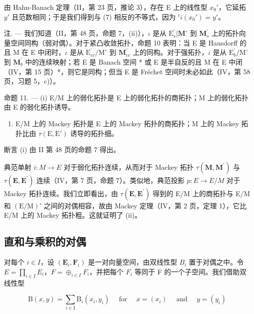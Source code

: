 由 Hahn-Banach 定理（II，第 23 页，推论 3），存在 E 上的线性型 \(x_0'\)，它延拓 \(y'\) 且范数相同；于是我们得到与 (7) 相反的不等式，因为 \({}^t i(x_0') = y'\)。

注. --- 我们知道（II，第 48 页，命题 7，(ii)），\(\iota\) 是从 \(\mathrm{E}_s^{\prime}|\mathbf{M}^{\circ}\) 到 \(\mathbf{M}_s^\prime\) 上的拓扑向量空间同构（弱对偶）。对于紧凸收敛拓扑，命题 10 表明：当 E 是 Hausdorff 的且 M 在 E 中闭时，\(\iota\) 是从 \(\mathrm{E}_{cc}^{\prime}/\mathrm{M}^{\circ}\) 到 \(\mathbf{M}_{cc}^{\prime}\) 上的同构。对于强拓扑，\(\iota\) 是从 \(\mathrm{E}_b^{\prime}/\mathrm{M}^{\circ}\) 到 \(\mathbf{M}_b^{\prime}\) 中的连续映射；若 E 是 Banach 空间 * 或 E 是半自反的且 M 在 E 中闭（IV，第 15 页）*，则它是同构；但当 E 是 Fréchet 空间时未必如此（IV，第 58 页，习题 5，c)）。

命题 11. --- (i) E/M 上的弱化拓扑是 E 上的弱化拓扑的商拓扑；M 上的弱化拓扑由 E 的弱化拓扑诱导。

\begin{enumerate}
\def\labelenumi{(\roman{enumi})}
\setcounter{enumi}{1}
\tightlist
\item
  E/M 上的 Mackey 拓扑是 E 上的 Mackey 拓扑的商拓扑；M 上的 Mackey 拓扑比由 \(\tau(\mathrm{E}, \mathrm{E}')\) 诱导的拓扑细。
\end{enumerate}

断言 (i) 由 II 第 48 页的命题 7 得出。

典范单射 \(i:M\to E\) 对于弱化拓扑连续，从而对于 Mackey 拓扑 \(\tau(\mathbf{M},\mathbf{M}^{\prime})\) 与 \(\tau(\mathbf{E},\mathbf{E}^{\prime})\) 连续（IV，第 7 页，命题 7）。类似地，典范投影 \(p:E\to E/M\) 对于 Mackey 拓扑连续。我们立即看出，由 \(\tau(\mathbf{E},\mathbf{E}^{\prime})\) 得到的 E/M 上的商拓扑与 E/M 和 \((\mathrm{E}/\mathrm{M})'\) 之间的对偶相容，故由 Mackey 定理（IV，第 2 页，定理 1），它比 E/M 上的 Mackey 拓扑粗。这就证明了 (ii)。

\subsection{直和与乘积的对偶}

对每个 \(i \in I\)，设 \((\mathbf{E}_{i}, \mathbf{F}_{i})\) 是一对向量空间，由双线性型 \(B_{i}\) 置于对偶之中。令 \(E = \prod_{i \in I} E_{i}\)，\(F = \oplus_{i \in I} F_{i}\)，并把每个 \(F_{i}\) 等同于 F 的一个子空间。我们借助双线性型

\[
\mathrm{B} (x, y) = \sum_ {i \in \mathrm{I}} \mathrm{B} _ {i} \left(x _ {i}, y _ {i}\right) \quad \text { for } \quad x = \left(x _ {i}\right) \quad \text { and } \quad y = \left(y _ {i}\right)\tag{8}
\]

